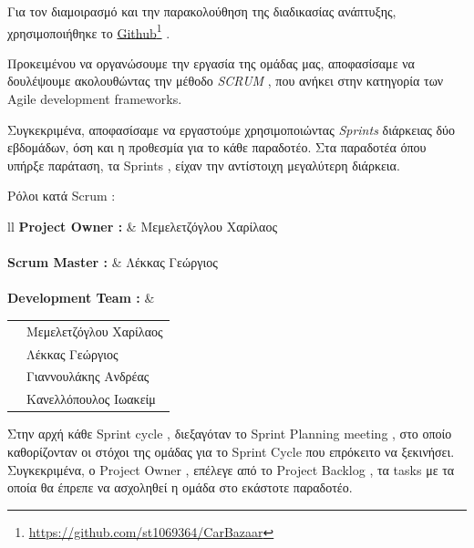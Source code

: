 \documentclass{../ol-softwaremanual}
\newcommand{\doclink}[2]{\href{#1}{#2}\footnote{\url{#1}}}
\begin{document}
	
	Για τον διαμοιρασμό και την παρακολούθηση της διαδικασίας ανάπτυξης, χρησιμοποιήθηκε το \en \doclink{https://github.com/st1069364/CarBazaar}{Github} \gr.
	
	
	
	\newpage
	
	\flushleft
	Προκειμένου να οργανώσουμε την εργασία της ομάδας μας, αποφασίσαμε να δουλέψουμε ακολουθώντας την μέθοδο \en \textit{SCRUM} \gr , που ανήκει στην κατηγορία των \en Agile development frameworks. \gr \break
	
	Συγκεκριμένα, αποφασίσαμε να εργαστούμε χρησιμοποιώντας \en \textit{Sprints} \gr διάρκειας δύο εβδομάδων, όση και η προθεσμία για το κάθε παραδοτέο. Στα παραδοτέα όπου υπήρξε παράταση, τα \en Sprints \gr, είχαν την αντίστοιχη μεγαλύτερη διάρκεια. \break
	
	Ρόλοι κατά \en Scrum \gr : \newline
	
	
	\flushleft
	\begin{tabular}{ll}
		\en \textbf{Project Owner : }  & \gr \hspace{5mm}  Μεμελετζόγλου Χαρίλαος \\
		\\ \en \textbf{Scrum Master : } &  \gr \hspace{5mm} Λέκκας Γεώργιος \\
		
		\\ \en \textbf{Development Team : } & \begin{tabular}[t]{ll}
			&  \gr  Μεμελετζόγλου Χαρίλαος  \\
			& \gr     Λέκκας Γεώργιος \\
			& \gr     Γιαννουλάκης Ανδρέας \\
			& \gr     Κανελλόπουλος Ιωακείμ \\
		\end{tabular} 
	\end{tabular} \linebreak
	
	\vspace{20pt}
	
	Στην αρχή κάθε \en Sprint cycle \gr , διεξαγόταν το \en Sprint Planning meeting \gr , στο οποίο καθορίζονταν οι στόχοι της ομάδας για το \en Sprint Cycle \gr που επρόκειτο να ξεκινήσει. Συγκεκριμένα, ο \en Project Owner \gr , επέλεγε από το \en Project Backlog \gr, τα \en tasks \gr με τα οποία θα έπρεπε να ασχοληθεί η ομάδα στο εκάστοτε παραδοτέο. \break
		
\end{document}
